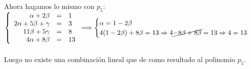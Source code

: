 \documentclass{article}
\begin{document}
Ahora hagamos lo mismo con $p_5$: \\
$
\left \{
\begin{array}{rcl}
	\alpha+2\beta &=& 1 \\
	2\alpha+5\beta+\gamma &=& 3 \\
	11\beta + 5\gamma &=& 8 \\
	4\alpha + 8\beta &=& 13
\end{array}
\right.
\Longrightarrow
\begin{cases}
	\alpha = 1-2\beta \\
	4(1-2\beta)+8\beta = 13 \Rightarrow 4\cancel{-8\beta + 8\beta} = 13 \Rightarrow  4=13
\end{cases}
$ \\ \\
Luego no existe una combinación lineal que de como resultado al polinomio $p_5$.
\\
\end{document}
